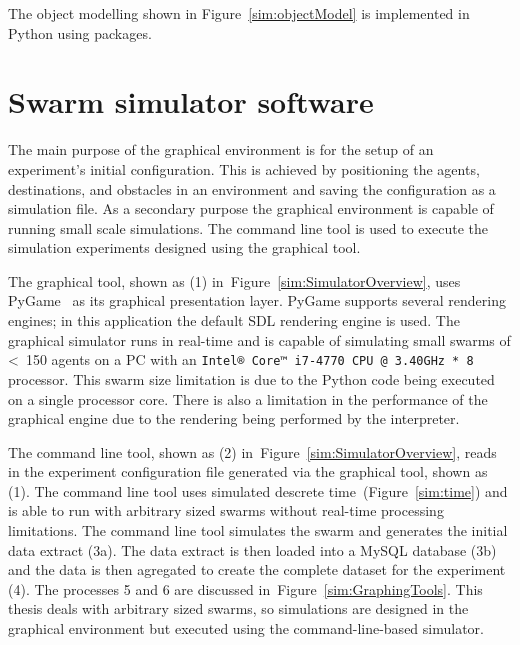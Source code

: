 The object modelling shown in Figure~\ref{sim:objectModel} is implemented in Python using packages.

\section{Swarm simulator software}\label{sim:Simulator2}
The main purpose of the graphical environment is for the setup of an experiment's initial configuration. This is achieved by positioning the agents, destinations, and obstacles in an environment and saving the configuration as a simulation file. As a secondary purpose the graphical environment is capable of running small scale simulations. The command line tool is used to execute the simulation experiments designed using the graphical tool. 

The graphical tool, shown as (1) in~Figure~\ref{sim:SimulatorOverview}, uses PyGame~\cite{PYGAME:15} as its graphical presentation layer. PyGame supports several rendering engines; in this application the default SDL rendering engine is used. The graphical simulator runs in real-time and is capable of simulating small swarms of \textless~150 agents on a PC with an \texttt{Intel® Core™ i7-4770 CPU @ 3.40GHz * 8} processor. This swarm size limitation is due to the Python code being executed on a single processor core. There is also a limitation in the performance of the graphical engine due to the rendering being performed by the interpreter.
 
The command line tool, shown as (2) in~Figure~\ref{sim:SimulatorOverview}, reads in the experiment configuration file generated via the graphical tool, shown as (1). The command line tool uses simulated descrete time~(Figure~\ref{sim:time}) and is able to run with arbitrary sized swarms without real-time processing limitations. The command line tool simulates the swarm and generates the initial data extract (3a). The data extract is then loaded into a MySQL database (3b) and the data is then agregated to create the complete dataset for the experiment (4). The processes 5 and 6 are discussed in~Figure~\ref{sim:GraphingTools}.  This thesis deals with arbitrary sized swarms, so simulations are designed in the graphical environment but executed using the command-line-based simulator. 

